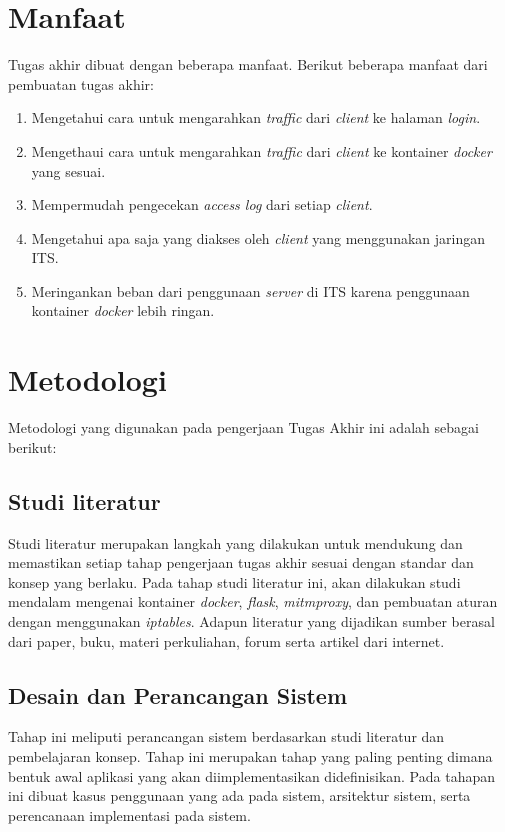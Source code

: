      \section{Manfaat}
	 Tugas akhir dibuat dengan beberapa manfaat. Berikut beberapa manfaat dari pembuatan tugas akhir:
	 \begin{enumerate}
	  \item Mengetahui cara untuk mengarahkan \textit{traffic} dari \textit{client} ke halaman \textit{login}.
	  \item Mengethaui cara untuk mengarahkan \textit{traffic} dari \textit{client} ke kontainer \textit{docker} yang sesuai.
	  \item Mempermudah pengecekan \textit{access log} dari setiap \textit{client}.
	  \item Mengetahui apa saja yang diakses oleh \textit{client} yang menggunakan jaringan ITS.
	  \item Meringankan beban dari penggunaan \textit{server} di ITS karena penggunaan kontainer \textit{docker} lebih ringan.
	 \end{enumerate}      
     
     \section{Metodologi}
     Metodologi yang digunakan pada pengerjaan Tugas Akhir ini
adalah sebagai berikut:
     \subsection{Studi literatur}
     Studi literatur merupakan langkah yang dilakukan untuk mendukung dan memastikan setiap tahap pengerjaan tugas akhir sesuai dengan standar dan konsep yang berlaku. Pada tahap studi literatur ini, akan dilakukan studi mendalam mengenai kontainer \textit{docker}, \textit{flask}, \textit{mitmproxy}, dan pembuatan aturan dengan menggunakan \textit{iptables}. Adapun literatur yang dijadikan sumber berasal dari paper, buku, materi perkuliahan, forum serta artikel dari internet.

\subsection{Desain dan Perancangan Sistem}
Tahap ini meliputi perancangan sistem berdasarkan studi literatur dan pembelajaran konsep. Tahap ini merupakan tahap yang paling penting dimana bentuk awal aplikasi yang akan diimplementasikan didefinisikan. Pada tahapan ini dibuat kasus penggunaan yang ada pada sistem, arsitektur sistem, serta perencanaan implementasi pada sistem.
